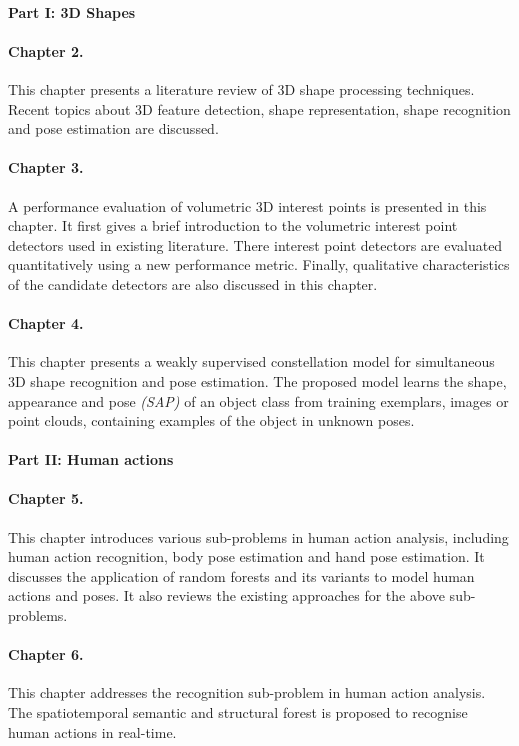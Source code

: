 \paragraph{Part I: 3D Shapes}

\paragraph{Chapter 2.} 
This chapter presents a literature review of 3D shape processing techniques.  
Recent topics about 3D feature detection, shape representation, shape recognition and pose estimation are discussed.  

\paragraph{Chapter 3.} 
A performance evaluation of volumetric 3D interest points is presented in this chapter. 
It first gives a brief introduction to the volumetric interest point detectors used in existing literature.
There interest point detectors are evaluated quantitatively using a new performance metric.
Finally, qualitative characteristics of the candidate detectors are also discussed in this chapter. 

\paragraph{Chapter 4.}
This chapter presents a weakly supervised constellation model for simultaneous 3D shape recognition and pose estimation. 
The proposed model learns the shape, appearance and pose \emph{(SAP)} of an object class from training exemplars, \eg images or point clouds, containing examples of the object in unknown poses.  

\paragraph{Part II: Human actions}

\paragraph{Chapter 5.} 
This chapter introduces various sub-problems in human action analysis, including human action recognition, body pose estimation and hand pose estimation. 
It discusses the application of random forests and its variants to model human actions and poses.    
It also reviews the existing approaches for the above sub-problems. 

\paragraph{Chapter 6.} 
This chapter addresses the recognition sub-problem in human action analysis. The spatiotemporal semantic and structural forest is proposed to recognise human actions in real-time.    

